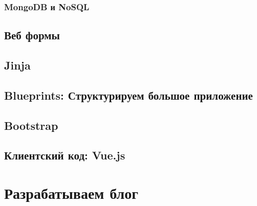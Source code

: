 \subsection{MongoDB и NoSQL}

\section{Веб формы}

\section{Jinja}

\section{Blueprints: Структурируем большое приложение}

\section{Bootstrap}

\section{Клиентский код: Vue.js}

\chapter{Разрабатываем блог}

